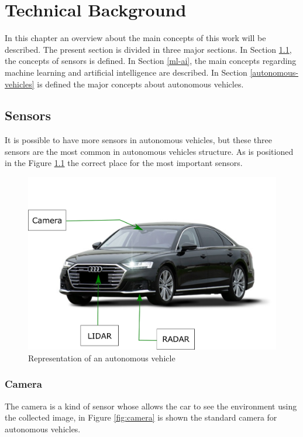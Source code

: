 \chapter{Technical Background}
\label{capitulo3}

In this chapter an overview about the main concepts of this work will be described. The present section is divided in three major sections. In Section \ref{sensors}, the concepts of sensors is defined. In Section \ref{ml-ai}, the main concepts regarding machine learning and artificial intelligence are described. In Section \ref{autonomous-vehicles} is defined the major concepts about autonomous vehicles.

\section{Sensors}\label{sensors}

It is possible to have more sensors in autonomous vehicles, but these three sensors are the most common in autonomous vehicles structure. As is positioned in the Figure \ref{fig:autonomous-vehicles} the correct place for the most important sensors.


\begin{figure}[H]
\centering
\includegraphics[scale=0.7]{imagens/image823.png}
\caption{Representation of an autonomous vehicle}
\label{fig:autonomous-vehicles}
\end{figure}


\subsection{Camera}
The camera is a kind of sensor whose allows the car to see the environment using the collected image, in Figure \ref{fig:camera} is shown the standard camera for autonomous vehicles.

